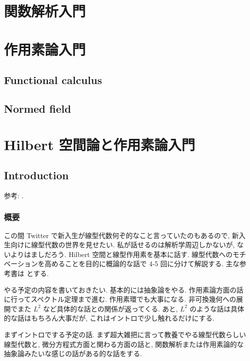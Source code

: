 \documentclass[openany, a4paper, oneside]{book}
\theoremstyle{break}
\theoremstyle{breakdefn}
\begin{document}
\chapter{関数解析入門}
\label{sec-7-2}
\chapter{作用素論入門}
\label{sec-7-3}
\section{Functional calculus}
\label{sec-7-3-1}
\section{Normed field}
\label{sec-7-3-2}
\chapter{Hilbert 空間論と作用素論入門}
\label{sec-7-4}
\section{Introduction}
\label{sec-7-4-1}

参考: \cite{KazuhikoAomoto1, AraiEzawa1, AraiEzawa2, AsaoArai4, HaimBrezis1,
HaimBrezis2, HiaiYanagi1, KenichiKanaya1, NaokiKurasawa1,
TomKoornwinder1, SeikiNishikawa1, NatsumeMoriyoshi1,
NoborizakaOnishiYamamoto1, MakotoOkazaki1, KimYamamoto1, HiroshiTanaka1}.
\subsection{概要}
\label{sec-7-4-1-1}

この間 Twitter で新入生が線型代数何ぞ的なこと言っていたのもあるので,
新入生向けに線型代数の世界を見せたい.
私が話せるのは解析学周辺しかないが, ないよりはましだろう.
Hilbert 空間と線型作用素を基本に話す.
線型代数へのモチベーションを高めることを目的に概論的な話で 4-5 回に分けて解説する.
主な参考書は \cite{HiaiYanagi1, AraiEzawa1, AraiEzawa2} とする.

やる予定の内容を書いておきたい.
基本的には抽象論をやる.
作用素論方面の話に行ってスペクトル定理まで進む.
作用素環でも大事になる.
非可換幾何への展開でまた $L^2$ など具体的な話との関係が返ってくる.
あと, $L^2$ のような話は具体的な話はもちろん大事だが, これはイントロで少し触れるだけにする.

まずイントロでする予定の話.
まず超大雑把に言って教養でやる線型代数らしい線型代数と,
微分方程式方面と関わる方面の話と, 関数解析または作用素論的な抽象論みたいな感じの話がある的な話をする.
\end{document}
